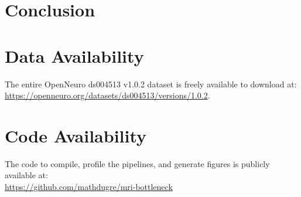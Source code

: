\documentclass[conference]{IEEEtran}
\begin{document}





\section{Conclusion}

\section{Data Availability}
\label{sec:data-availability}
The entire OpenNeuro ds004513 v1.0.2 dataset is freely available to download at:
\\\href{https://openneuro.org/datasets/ds004513/versions/1.0.2}{https://openneuro.org/datasets/ds004513/versions/1.0.2}.

\section{Code Availability}
\label{sec:code-availability}
The code to compile, profile the pipelines, and generate figures is publicly available at:
\\\href{https://github.com/mathdugre/mri-bottleneck}{https://github.com/mathdugre/mri-bottleneck}
\end{document}
